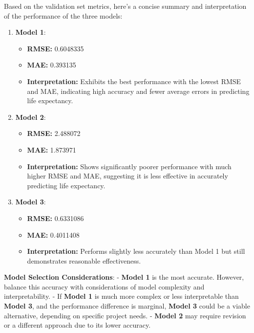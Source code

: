 \documentclass[
]{article}
\providecommand{\tightlist}{%
  \setlength{\itemsep}{0pt}\setlength{\parskip}{0pt}}
\begin{document}
Based on the validation set metrics, here's a concise summary and
interpretation of the performance of the three models:

\begin{enumerate}
\def\labelenumi{\arabic{enumi}.}
\tightlist
\item
  \textbf{Model 1}:

  \begin{itemize}
  \tightlist
  \item
    \textbf{RMSE:} 0.6048335
  \item
    \textbf{MAE:} 0.393135
  \item
    \textbf{Interpretation:} Exhibits the best performance with the
    lowest RMSE and MAE, indicating high accuracy and fewer average
    errors in predicting life expectancy.
  \end{itemize}
\item
  \textbf{Model 2}:

  \begin{itemize}
  \tightlist
  \item
    \textbf{RMSE:} 2.488072
  \item
    \textbf{MAE:} 1.873971
  \item
    \textbf{Interpretation:} Shows significantly poorer performance with
    much higher RMSE and MAE, suggesting it is less effective in
    accurately predicting life expectancy.
  \end{itemize}
\item
  \textbf{Model 3}:

  \begin{itemize}
  \tightlist
  \item
    \textbf{RMSE:} 0.6331086
  \item
    \textbf{MAE:} 0.4011408
  \item
    \textbf{Interpretation:} Performs slightly less accurately than
    Model 1 but still demonstrates reasonable effectiveness.
  \end{itemize}
\end{enumerate}

\textbf{Model Selection Considerations}: - \textbf{Model 1} is the most
accurate. However, balance this accuracy with considerations of model
complexity and interpretability. - If \textbf{Model 1} is much more
complex or less interpretable than \textbf{Model 3}, and the performance
difference is marginal, \textbf{Model 3} could be a viable alternative,
depending on specific project needs. - \textbf{Model 2} may require
revision or a different approach due to its lower accuracy.
\end{document}
